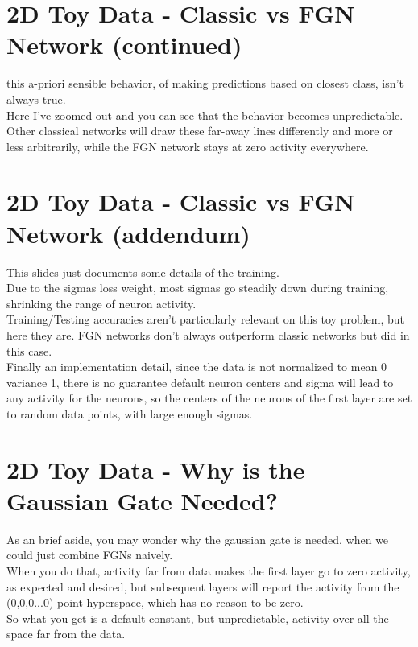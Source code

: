 \documentclass{article}
\begin{document}
\section{2D Toy Data - Classic vs FGN Network (continued)}
this a-priori sensible behavior, of making predictions based on closest class, isn't always true.\\
Here I've zoomed out and you can see that the behavior becomes unpredictable. Other classical networks will draw these far-away lines differently and more or less arbitrarily, while the FGN network stays at zero activity everywhere.

\section{2D Toy Data - Classic vs FGN Network (addendum)}
This slides just documents some details of the training.\\
Due to the sigmas loss weight, most sigmas go steadily down during training, shrinking the range of neuron activity.\\
Training/Testing accuracies aren't particularly relevant on this toy problem, but here they are. FGN networks don't always outperform classic networks but did in this case.\\
Finally an implementation detail, since the data is not normalized to mean 0 variance 1, there is no guarantee default neuron centers and sigma will lead to any activity for the neurons, so the centers of the neurons of the first layer are set to random data points, with large enough sigmas.

\section{2D Toy Data - Why is the Gaussian Gate Needed?}
As an brief aside, you may wonder why the gaussian gate is needed, when we could just combine FGNs naively.\\
When you do that, activity far from data makes the first layer go to zero activity, as expected and desired, but subsequent layers will report the activity from the (0,0,0...0) point hyperspace, which has no reason to be zero.\\
So what you get is a default constant, but unpredictable, activity over all the space far from the data.
\end{document}
